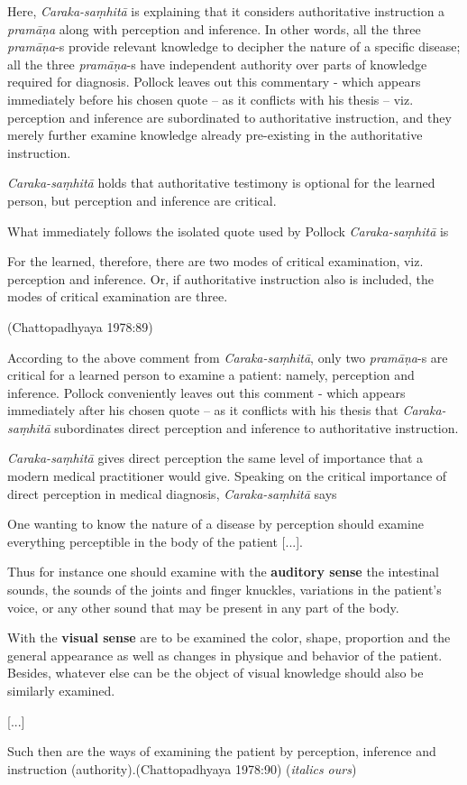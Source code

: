 Here, {\sl Caraka-saṃhitā} is explaining that it considers authoritative instruction a {\sl pramāṇa} along with perception and inference. In other words, all the three {\sl pramāṇa}-s provide relevant knowledge to decipher the nature of a specific disease; all the three {\sl pramāṇa}-s have independent authority over parts of knowledge required for diagnosis. Pollock leaves out this commentary - which appears immediately before his chosen quote -- as it conflicts with his thesis -- viz. perception and inference are subordinated to authoritative instruction, and they merely further examine knowledge already pre-existing in the authoritative instruction.

{\sl Caraka-saṃhitā} holds that authoritative testimony is optional for the learned person, but perception and inference are critical.

What immediately follows the isolated quote used by Pollock {\sl Caraka-saṃhitā} is 
\begin{myquote}
For the learned, therefore, there are two modes of critical examination, viz. perception and inference. Or, if authoritative instruction also is included, the modes of critical examination are three.

\hfill (Chattopadhyaya 1978:89)
\end{myquote}

According to the above comment from {\sl Caraka-saṃhitā}, only two {\sl pramāṇa}-s are critical for a learned person to examine a patient: namely, perception and inference. Pollock conveniently leaves out this comment - which appears immediately after his chosen quote -- as it conflicts with his thesis that {\sl Caraka-saṃhitā} subordinates direct perception and inference to authoritative instruction.  

{{\sl Caraka-saṃhitā}\relax} gives direct perception the same level of importance that a modern medical practitioner would give. Speaking on the critical importance of direct perception in medical diagnosis, {\sl Caraka-saṃhitā} says 
\begin{myquote}
One wanting to know the nature of a disease by perception should examine everything perceptible in the body of the patient [...].

Thus for instance one should examine with the {\bf auditory sense} the intestinal sounds, the sounds of the joints and finger knuckles, variations in the patient's voice, or any other sound that may be present in any part of the body.  

With the {\bf visual sense} are to be examined the color, shape, proportion and the general appearance as well as changes in physique and behavior of the patient.  Besides, whatever else can be the object of visual knowledge should also be similarly examined.

[...]

Such then are the ways of examining the patient by perception, inference and instruction (authority).\hfill (Chattopadhyaya 1978:90) ({\sl italics ours})
\end{myquote}

